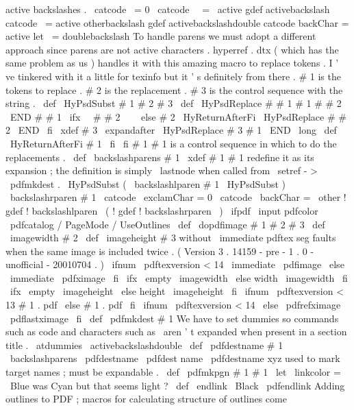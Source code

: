 active
backslashes
.
%
{
\
catcode
\
=
0
\
catcode
\
\
=
\
active
gdef
activebackslash
{
catcode
\
=
active
otherbackslash
}
gdef
activebackslashdouble
{
%
catcode
backChar
=
active
let
\
=
doublebackslash
}
}
%
To
handle
parens
we
must
adopt
a
different
approach
since
parens
are
%
not
active
characters
.
hyperref
.
dtx
(
which
has
the
same
problem
as
%
us
)
handles
it
with
this
amazing
macro
to
replace
tokens
.
I
'
ve
%
tinkered
with
it
a
little
for
texinfo
but
it
'
s
definitely
from
there
.
%
%
#
1
is
the
tokens
to
replace
.
%
#
2
is
the
replacement
.
%
#
3
is
the
control
sequence
with
the
string
.
%
\
def
\
HyPsdSubst
#
1
#
2
#
3
{
%
\
def
\
HyPsdReplace
#
#
1
#
1
#
#
2
\
END
{
%
#
#
1
%
\
ifx
\
\
#
#
2
\
\
%
\
else
#
2
%
\
HyReturnAfterFi
{
%
\
HyPsdReplace
#
#
2
\
END
}
%
\
fi
}
%
\
xdef
#
3
{
\
expandafter
\
HyPsdReplace
#
3
#
1
\
END
}
%
}
\
long
\
def
\
HyReturnAfterFi
#
1
\
fi
{
\
fi
#
1
}
%
#
1
is
a
control
sequence
in
which
to
do
the
replacements
.
\
def
\
backslashparens
#
1
{
%
\
xdef
#
1
{
#
1
}
%
redefine
it
as
its
expansion
;
the
definition
is
simply
%
\
lastnode
when
called
from
\
setref
-
>
\
pdfmkdest
.
\
HyPsdSubst
{
(
}
{
\
backslashlparen
}
{
#
1
}
%
\
HyPsdSubst
{
)
}
{
\
backslashrparen
}
{
#
1
}
%
}
{
\
catcode
\
exclamChar
=
0
\
catcode
\
backChar
=
\
other
!
gdef
!
backslashlparen
{
\
(
}
%
!
gdef
!
backslashrparen
{
\
)
}
%
}
\
ifpdf
\
input
pdfcolor
\
pdfcatalog
{
/
PageMode
/
UseOutlines
}
%
\
def
\
dopdfimage
#
1
#
2
#
3
{
%
\
def
\
imagewidth
{
#
2
}
%
\
def
\
imageheight
{
#
3
}
%
%
without
\
immediate
pdftex
seg
faults
when
the
same
image
is
%
included
twice
.
(
Version
3
.
14159
-
pre
-
1
.
0
-
unofficial
-
20010704
.
)
\
ifnum
\
pdftexversion
<
14
\
immediate
\
pdfimage
\
else
\
immediate
\
pdfximage
\
fi
\
ifx
\
empty
\
imagewidth
\
else
width
\
imagewidth
\
fi
\
ifx
\
empty
\
imageheight
\
else
height
\
imageheight
\
fi
\
ifnum
\
pdftexversion
<
13
#
1
.
pdf
%
\
else
{
#
1
.
pdf
}
%
\
fi
\
ifnum
\
pdftexversion
<
14
\
else
\
pdfrefximage
\
pdflastximage
\
fi
}
\
def
\
pdfmkdest
#
1
{
{
%
%
We
have
to
set
dummies
so
commands
such
as
code
and
characters
%
such
as
\
aren
'
t
expanded
when
present
in
a
section
title
.
\
atdummies
\
activebackslashdouble
\
def
\
pdfdestname
{
#
1
}
%
\
backslashparens
\
pdfdestname
\
pdfdest
name
{
\
pdfdestname
}
xyz
%
}
}
%
%
%
used
to
mark
target
names
;
must
be
expandable
.
\
def
\
pdfmkpgn
#
1
{
#
1
}
%
%
\
let
\
linkcolor
=
\
Blue
%
was
Cyan
but
that
seems
light
?
\
def
\
endlink
{
\
Black
\
pdfendlink
}
%
Adding
outlines
to
PDF
;
macros
for
calculating
structure
of
outlines
%
come
